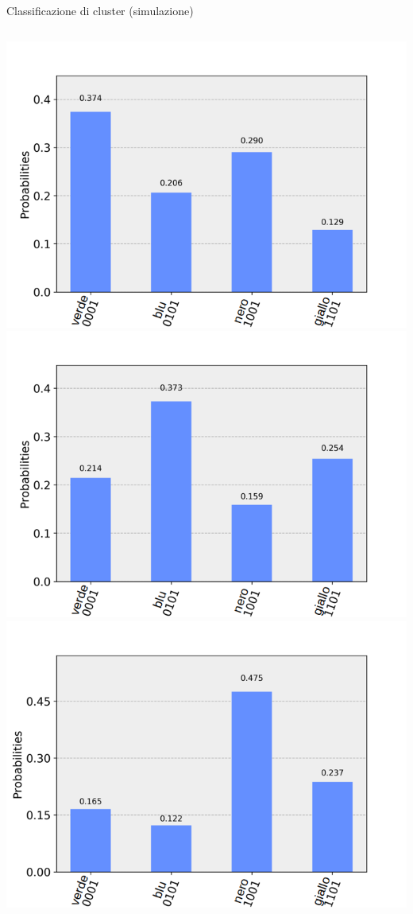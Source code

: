 \documentclass{beamer}
\begin{document}
    \begin{frame}{Classificazione di cluster (simulazione)}
        \begin{columns}
            \includegraphics[width=.9\linewidth]{gfx/Clusters/Simulated/green}
            \includegraphics[width=.9\linewidth]{gfx/Clusters/Simulated/blue}
            \includegraphics[width=.9\linewidth]{gfx/Clusters/Simulated/black}

\end{columns}
\end{frame}
\end{document}
